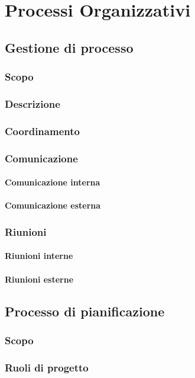 \section{Processi Organizzativi}
\subsection{Gestione di processo}
\subsubsection{Scopo}
\subsubsection{Descrizione}
\subsubsection{Coordinamento}
\subsubsection{Comunicazione}
\paragraph{Comunicazione interna}
\paragraph{Comunicazione esterna}
\subsubsection{Riunioni}
\paragraph{Riunioni interne}
\paragraph{Riunioni esterne}

\subsection{Processo di pianificazione}
\subsubsection{Scopo}
\subsubsection{Ruoli di progetto}
